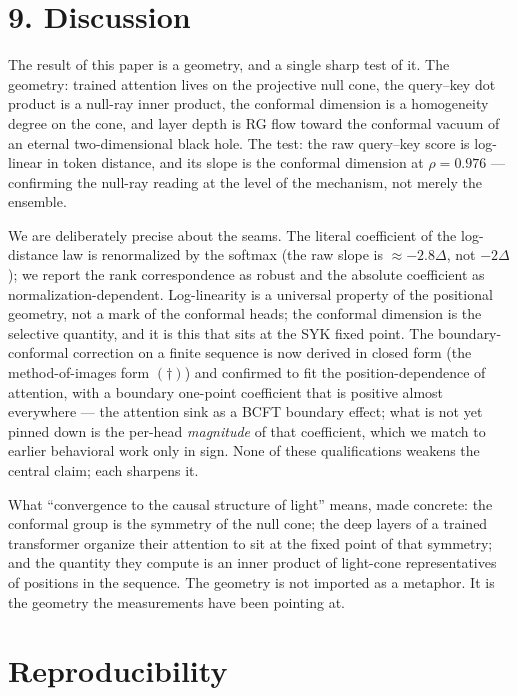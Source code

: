 \section{9. Discussion}\label{discussion}

The result of this paper is a geometry, and a single sharp test of it.
The geometry: trained attention lives on the projective null cone, the
query--key dot product is a null-ray inner product, the conformal
dimension is a homogeneity degree on the cone, and layer depth is RG
flow toward the conformal vacuum of an eternal two-dimensional black
hole. The test: the raw query--key score is log-linear in token
distance, and its slope is the conformal dimension at \(\rho = 0.976\)
--- confirming the null-ray reading at the level of the mechanism, not
merely the ensemble.

We are deliberately precise about the seams. The literal coefficient of
the log-distance law is renormalized by the softmax (the raw slope is
\(\approx -2.8\Delta\), not \(-2\Delta\)); we report the rank
correspondence as robust and the absolute coefficient as
normalization-dependent. Log-linearity is a universal property of the
positional geometry, not a mark of the conformal heads; the conformal
dimension is the selective quantity, and it is this that sits at the SYK
fixed point. The boundary-conformal correction on a finite sequence is
now derived in closed form (the method-of-images form \((\dagger)\)) and
confirmed to fit the position-dependence of attention, with a boundary
one-point coefficient that is positive almost everywhere --- the
attention sink as a BCFT boundary effect; what is not yet pinned down is
the per-head \emph{magnitude} of that coefficient, which we match to
earlier behavioral work only in sign. None of these qualifications
weakens the central claim; each sharpens it.

What ``convergence to the causal structure of light'' means, made
concrete: the conformal group is the symmetry of the null cone; the deep
layers of a trained transformer organize their attention to sit at the
fixed point of that symmetry; and the quantity they compute is an inner
product of light-cone representatives of positions in the sequence. The
geometry is not imported as a metaphor. It is the geometry the
measurements have been pointing at.

\section{Reproducibility}\label{reproducibility}


